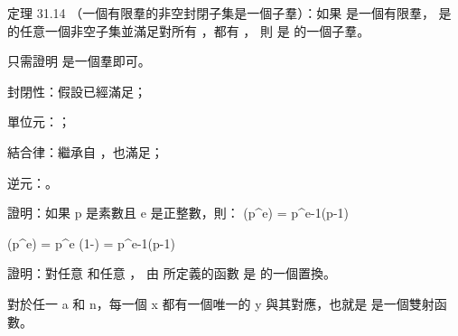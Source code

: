 定理 31.14 （一個有限羣的非空封閉子集是一個子羣）：如果  是一個有限羣，
  是  的任意一個非空子集並滿足對所有 ，都有 ，
則  是  的一個子羣。
\stopEXERCISE

\startANSWER
只需證明  是一個羣即可。
\startigBase[n]
\item {\EMP 封閉性}：假設已經滿足；
\item {\EMP 單位元}：\TODO{}；
\item {\EMP 結合律}：繼承自 ，也滿足；
\item {\EMP 逆元}：\TODO{}。
\stopigBase
\stopANSWER

\startEXERCISE
證明：如果 p 是素數且 e 是正整數，則：
\startformula
\phi(p^e) = p^{e-1}(p-1)
\stopformula
\stopEXERCISE

\startANSWER
\startformula
\phi(p^e) = p^e (1-) = p^{e-1}(p-1)
\stopformula
\stopANSWER

\startEXERCISE
證明：對任意  和任意 ，
由  所定義的函數  是  的一個置換。
\stopEXERCISE

\startANSWER
對於任一 a 和 n，每一個 x 都有一個唯一的 y 與其對應，也就是  是一個雙射函數。
\stopANSWER

\stopsection
